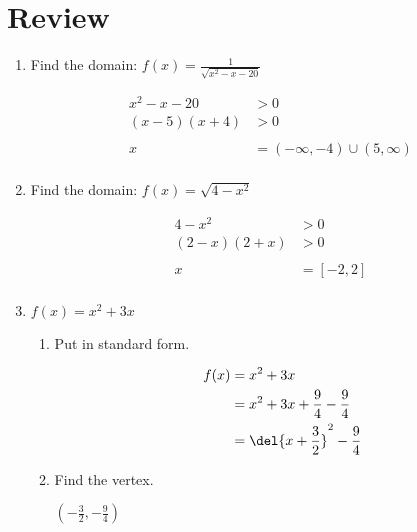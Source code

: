 \documentclass{exam}
\begin{document}
  \section{Review}
  \begin{enumerate}
    \item Find the domain: $f(x) = \frac{1}{\sqrt{x^2 - x - 20}}$
      \begin{solution}
        \begin{align*}
          x^2 - x - 20   &> 0 \\
          (x - 5)(x + 4) &> 0 \\
          \\
          x &= \left( -\infty, -4 \right) \cup \left( 5, \infty \right) \\
        \end{align*}
      \end{solution}

    \item Find the domain: $f(x) = \sqrt{4 - x^2}$
      \begin{solution}
        \begin{align*}
          4 - x^2 &> 0 \\
          (2 - x)(2 + x) &> 0 \\
          \\
          x &= [-2, 2] \\
        \end{align*}
      \end{solution}

    \item $f(x) = x^2 + 3x$ 
      \begin{enumerate}[a]
        \item Put in standard form.
          \begin{solution}
            \begin{align*}
              f(x) &= x^2 + 3x \\
              &= x^2 + 3x + \frac{9}{4} - \frac{9}{4} \\
              &= \del{ x + \frac{3}{2} }^2 - \frac{9}{4} \\
            \end{align*}
          \end{solution}

        \item Find the vertex.
          \begin{solution}
            $ \left( -\frac{3}{2}, - \frac{9}{4} \right) $
          \end{solution}


\end{enumerate}
\end{enumerate}
\end{document}
